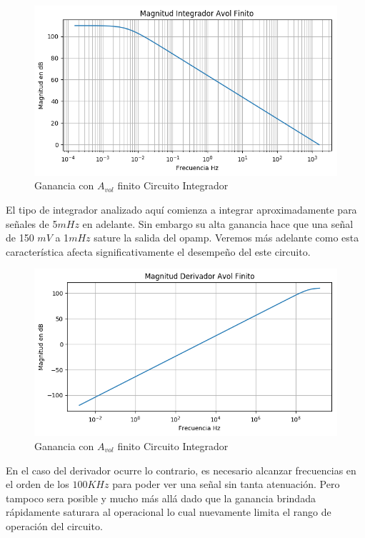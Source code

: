 \begin{figure}[H]
	\centering
	\includegraphics[width=\textwidth]{Ejercicio4/BODE-AVOL-FINITO-MAGNITUD-INTEGRADOR}
	\caption{Ganancia con $A_{vol}$ finito Circuito Integrador}
\end{figure}
El tipo de integrador analizado aquí comienza a integrar aproximadamente para señales de 5$mHz$ en adelante. Sin embargo su alta ganancia hace que una señal de 150 $mV$ a 1$mHz$ sature la salida del opamp. Veremos más adelante como esta característica afecta significativamente el desempeño del este circuito.
\begin{figure}[H]
	\centering
	\includegraphics[width=\textwidth]{Ejercicio4/BODE-AVOL-FINITO-MAGNITUD-DERIVADOR}
	\caption{Ganancia con $A_{vol}$ finito Circuito Integrador}
\end{figure}

En el caso del derivador ocurre lo contrario, es necesario alcanzar frecuencias en el orden de los $100KHz$ para poder ver una señal sin tanta atenuación. Pero tampoco sera posible y mucho más allá dado que la ganancia brindada rápidamente saturara al operacional lo cual nuevamente limita el rango de operación del circuito. 

